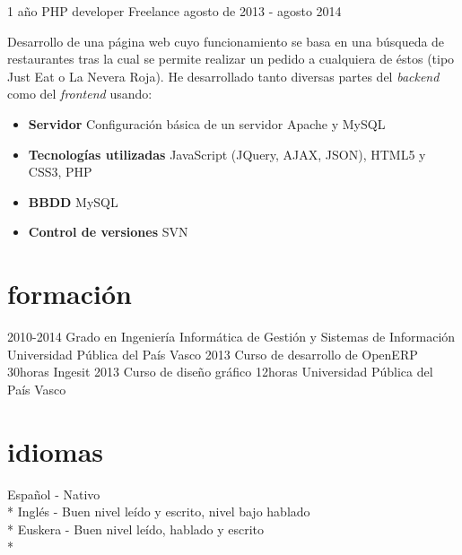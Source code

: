 \documentclass[]{friggeri-cv} %
\begin{document}
\begin{entrylist}
\entry
{1 año}
{PHP developer {\normalfont Freelance}}
{agosto de 2013 - agosto 2014}
{Desarrollo de una p\'agina web cuyo funcionamiento se basa en una b\'usqueda de restaurantes tras la cual se permite realizar un pedido a cualquiera de \'estos (tipo Just Eat o La Nevera Roja). He desarrollado tanto diversas partes del \textit{backend} como del \textit{frontend} usando:
\begin{itemize}
\item\textbf{Servidor} Configuraci\'on b\'asica de un servidor Apache y MySQL
\item\textbf{Tecnolog\'ias utilizadas} JavaScript (JQuery, AJAX, JSON), HTML5 y CSS3, PHP
\item\textbf{BBDD}	MySQL
\item\textbf{Control de versiones} SVN\\
\end{itemize}}
\end{entrylist}
\section{formaci\'on}
\begin{entrylist}
\entry
{2010-2014}
{Grado en Ingenier\'ia Inform\'atica {\normalfont de Gesti\'on y Sistemas de Informaci\'on}}
{}
{Universidad P\'ublica del Pa\'is Vasco}
\entry
{2013}
{Curso de desarrollo de OpenERP}
{30horas}
{Ingesit}
\entry
{2013}
{Curso de diseño gr\'afico}
{12horas}
{Universidad P\'ublica del Pa\'is Vasco}
\end{entrylist}

\section{idiomas}
\begin{entrylist}
Español - Nativo \\* 
Ingl\'es -  Buen nivel le\'ido y escrito, nivel bajo hablado\\* 
Euskera -  Buen nivel le\'ido, hablado y escrito\\* 
\end{entrylist}
\end{document}
